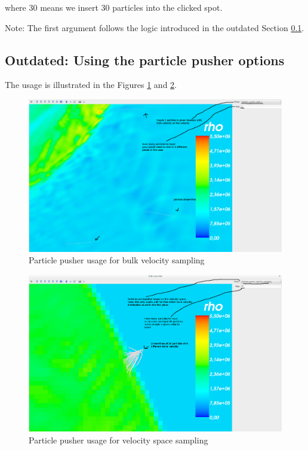 \documentclass[a4paper,10pt]{article}
\begin{document}
where 30 means we insert 30 particles into the clicked spot.

Note: The first argument follows the logic introduced in the outdated Section \ref{ssec:outdated}.

\subsection{Outdated: Using the particle pusher options} \label{ssec:outdated}

The usage is illustrated in the Figures \ref{fig:particle1} and \ref{fig:particle2}.

\begin{figure}[H]
 \centering
 \includegraphics[width=\textwidth]{../images/particlepusherbulk.png}
 \caption{Particle pusher usage for bulk velocity sampling}
 \label{fig:particle1}
\end{figure}

\begin{figure}[H]
 \centering
 \includegraphics[width=\textwidth]{../images/particlepushersampling.png}
 \caption{Particle pusher usage for velocity space sampling}
 \label{fig:particle2}
\end{figure}
\end{document}

